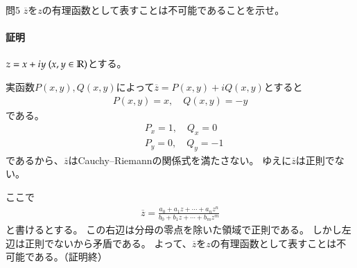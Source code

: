 \begin{mysimplebox}{問5}
    $\overline{z}$を$z$の有理函数として表すことは不可能であることを示せ。
\end{mysimplebox}
\paragraph{証明}
$z=x+iy\ (x,y\in\mathbb{R})$とする。

実函数$P(x,y),Q(x,y)$によって$\overline{z}=P(x,y)+iQ(x,y)$とすると
\begin{align*}
    P(x,y)=x,\quad Q(x,y)=-y
\end{align*}
である。
\begin{align*}
    &P_x=1,\quad Q_x=0\\
    &P_y=0,\quad Q_y=-1
\end{align*}
であるから、$\overline{z}$はCauchy--Riemannの関係式を満たさない。
ゆえに$\overline{z}$は正則でない。

ここで
\begin{align*}
    \overline{z}=\frac{a_0+a_1z+\cdots+a_nz^n}{b_0+b_1z+\cdots+b_mz^m}
\end{align*}
と書けるとする。
この右辺は分母の零点を除いた領域で正則である。
しかし左辺は正則でないから矛盾である。
よって、$\overline{z}$を$z$の有理函数として表すことは不可能である。（証明終）